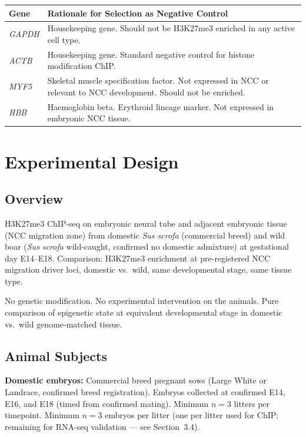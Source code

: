 \documentclass[10pt, a4paper]{article}
\begin{document}
\begin{center}
\small
\begin{tabular}{p{2.2cm}p{10.5cm}}
\toprule
\textbf{Gene} &
\textbf{Rationale for Selection as
Negative Control} \\
\midrule
\textit{GAPDH} &
Housekeeping gene. Should not be
H3K27me3 enriched in any active cell type. \\[0.2em]
\textit{ACTB} &
Housekeeping gene. Standard negative
control for histone modification ChIP. \\[0.2em]
\textit{MYF5} &
Skeletal muscle specification factor.
Not expressed in NCC or relevant to
NCC development. Should not be enriched. \\[0.2em]
\textit{HBB} &
Haemoglobin beta. Erythroid lineage
marker. Not expressed in embryonic
NCC tissue. \\
\bottomrule
\end{tabular}
\end{center}

\section{Experimental Design}
\label{sec:design}

\subsection{Overview}

H3K27me3 ChIP-seq on embryonic neural tube
and adjacent embryonic tissue (NCC migration
zone) from domestic \textit{Sus scrofa}
(commercial breed) and wild boar
(\textit{Sus scrofa} wild-caught, confirmed
no domestic admixture) at gestational day
E14--E18. Comparison: H3K27me3 enrichment
at pre-registered NCC migration driver loci,
domestic vs.\ wild, same developmental stage,
same tissue type.

No genetic modification. No
experimental intervention on the animals.
Pure comparison of epigenetic state at
equivalent developmental stage in
domestic vs.\ wild genome-matched tissue.

\subsection{Animal Subjects}

\textbf{Domestic embryos:}
Commercial breed pregnant sows
(Large White or Landrace, confirmed
breed registration). Embryos collected
at confirmed E14, E16, and E18
(timed from confirmed mating).
Minimum $n = 3$ litters per timepoint.
Minimum $n = 3$ embryos per litter
(one per litter used for ChIP;
remaining for RNA-seq validation ---
see Section~3.4).
\end{document}
